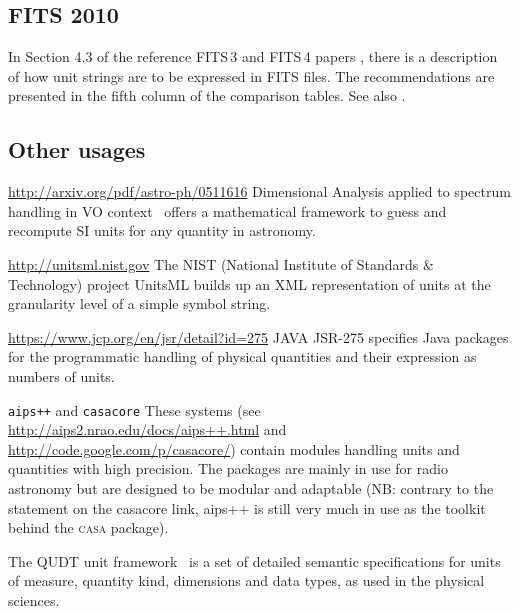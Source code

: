 \documentclass[11pt,a4paper]{ivoa}
\newcommand{\violet}{\textcolor[rgb]{0.50,0.00,0.50}}
\begin{document}
\subsection{FITS 2010}

In Section 4.3 of the reference FITS\,3 and FITS\,4 papers
\citep{pence10,fits4}, there is a description of
how unit strings are to be expressed in FITS files. The
recommendations are presented in the fifth column of the comparison
tables.  See also .

\subsection{Other usages}

\begin{bigdescription}
\item[\url{http://arxiv.org/pdf/astro-ph/0511616}]
Dimensional Analysis applied to spectrum handling in VO context~\citep{osuna05}
offers a mathematical framework to guess and recompute
SI units for any quantity in astronomy.

\item[\url{http://unitsml.nist.gov}]
The NIST (National Institute of Standards \& Technology) project
UnitsML builds up an XML representation of units at the granularity
level of a simple symbol string.

\item[\url{https://www.jcp.org/en/jsr/detail?id=275}]
JAVA JSR-275 specifies Java packages for the programmatic
handling of physical quantities and their expression as numbers of
units.
\item[\texttt{aips++} and \texttt{casacore}]
These systems (see \url{http://aips2.nrao.edu/docs/aips++.html} and
 \url{http://code.google.com/p/casacore/}) contain modules handling
 units and quantities with high precision. The packages are mainly in use for
radio astronomy but are designed to be modular and adaptable (NB:
contrary to the statement on the casacore link, aips++ is still very much in
use as the toolkit behind the \textsc{casa} package).
\item The QUDT unit framework~\citep{qudt} is a set of detailed
  semantic specifications for units of measure, quantity kind,
  dimensions and data types, as used in the physical sciences.
\end{bigdescription}
\clearpage
\end{document}

